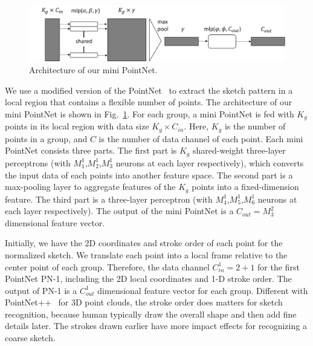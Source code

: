 \begin{figure}
	\centering
	\includegraphics[width=\columnwidth]{images/pointnet.png}
	\caption{Architecture of our mini PointNet.}
	\label{fig:miniPN}
\end{figure}
%
We use a modified version of the PointNet~\cite{qi2017pointnet} to extract the sketch pattern in a local region that contains a flexible number of points.
The architecture of our mini PointNet is shown in Fig.~\ref{fig:miniPN}.
%
%
For each group, a mini PointNet is fed with $K_g$ points in its local region with data size $K_g \times C_{in}$.
Here, $K_g$ is the number of points in a group, and $C$ is the number of data channel of each point.
Each mini PointNet consists three parts.
The first part is $K_g$ shared-weight three-layer perceptrons (with $M^{1}_1$,$M^{1}_2$,$M^{1}_3$ neurons at each layer respectively), which converts the input data of each points into another feature space. 
%
The second part is a max-pooling layer to aggregate features of the $K_g$ points into a fixed-dimension feature.
%
The third part is a three-layer perceptron (with $M^{1}_4$,$M^{1}_5$,$M^{1}_6$ neurons at each layer respectively). 
%
The output of the mini PointNet is a $C_{out}=M^{2}_3$ dimensional feature vector.


Initially, we have the 2{D} coordinates and stroke order of each point for the normalized sketch.
We translate each point into a local frame relative to the center point of each group.
Therefore, the data channel $C^1_{in}=2+1$ for the first PointNet PN-1, including the 2D local coordinates and 1-D stroke order.
The output of PN-1 is a $C^1_{out}$ dimensional feature vector for each group.
%
Different with PointNet++~\cite{qi2017pointnetplusplus} for 3D point clouds, the stroke order does matters for sketch recognition, because human typically draw the overall shape and then add fine details later.
%
The strokes drawn earlier have more impact effects for recognizing a coarse sketch.
%


